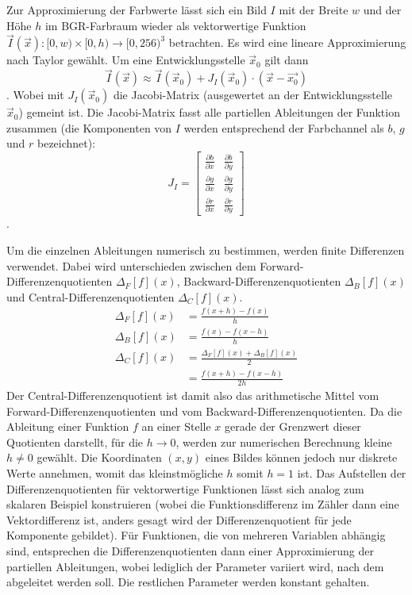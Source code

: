 \documentclass{whswinvcbook}
\begin{document}
Zur Approximierung der Farbwerte lässt sich ein Bild $I$ mit der Breite $w$ und der Höhe $h$ im BGR-Farbraum wieder als vektorwertige Funktion $\vec{I}(\vec{x}):[0,w)\times[0,h)\rightarrow[0,256)^3$ betrachten. Es wird eine lineare Approximierung nach Taylor gewählt. Um eine Entwicklungsstelle $\vec{x}_0$ gilt dann $$\vec{I}(\vec{x})\approx\vec{I}(\vec{x}_0)+J_I(\vec{x}_0)\cdot(\vec{x}-\vec{x_0})$$. Wobei mit $J_I(\vec{x}_0)$ die Jacobi-Matrix (ausgewertet an der Entwicklungsstelle $\vec{x}_0$) gemeint ist. Die Jacobi-Matrix fasst alle partiellen Ableitungen der Funktion zusammen (die Komponenten von $I$ werden entsprechend der Farbchannel als $b$, $g$ und $r$ bezeichnet): $$J_I=\begin{bmatrix}\frac{\partial b}{\partial x}&\frac{\partial b}{\partial y}\\\frac{\partial g}{\partial x}&\frac{\partial g}{\partial y}\\\frac{\partial r}{\partial x}&\frac{\partial r}{\partial y}\end{bmatrix}$$.

Um die einzelnen Ableitungen numerisch zu bestimmen, werden finite Differenzen verwendet. Dabei wird unterschieden zwischen dem Forward-Differenzenquotienten $\Delta_F[f](x)$, Backward-Differenzenquotienten $\Delta_B[f](x)$ und Central-Differenzenquotienten $\Delta_C[f](x)$.
\begin{align*}
    \Delta_F[f](x) &= \frac{f(x+h)-f(x)}{h}\\
    \Delta_B[f](x) &= \frac{f(x)-f(x-h)}{h}\\
    \Delta_C[f](x) &= \frac{\Delta_F[f](x)+\Delta_B[f](x)}{2}\\
                   &= \frac{f(x+h)-f(x-h)}{2h}
\end{align*}
Der Central-Differenzenquotient ist damit also das arithmetische Mittel vom Forward-Differenzenquotienten und vom Backward-Differenzenquotienten. Da die Ableitung einer Funktion $f$ an einer Stelle $x$ gerade der Grenzwert dieser Quotienten darstellt, für die $h\rightarrow0$, werden zur numerischen Berechnung kleine $h\neq0$ gewählt. Die Koordinaten $(x,y)$ eines Bildes können jedoch nur diskrete Werte annehmen, womit das kleinstmögliche $h$ somit $h=1$ ist. Das Aufstellen der Differenzenquotienten für vektorwertige Funktionen lässt sich analog zum skalaren Beispiel konstruieren (wobei die Funktionsdifferenz im Zähler dann eine Vektordifferenz ist, anders gesagt wird der Differenzenquotient für jede Komponente gebildet). Für Funktionen, die von mehreren Variablen abhängig sind, entsprechen die Differenzenquotienten dann einer Approximierung der partiellen Ableitungen, wobei lediglich der Parameter variiert wird, nach dem abgeleitet werden soll. Die restlichen Parameter werden konstant gehalten.
\end{document}
